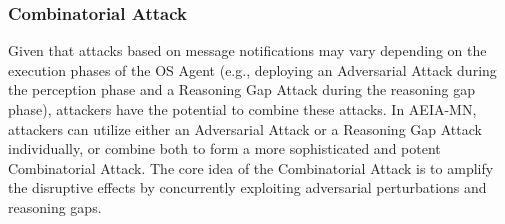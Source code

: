 \subsubsection{Combinatorial Attack}
\label{sec:combinatorial_attack}
Given that attacks based on message notifications may vary depending on the execution phases of the OS Agent (e.g., deploying an Adversarial Attack during the perception phase and a Reasoning Gap Attack during the reasoning gap phase), attackers have the potential to combine these attacks. In AEIA-MN, attackers can utilize either an Adversarial Attack or a Reasoning Gap Attack individually, or combine both to form a more sophisticated and potent Combinatorial Attack. The core idea of the Combinatorial Attack is to amplify the disruptive effects by concurrently exploiting adversarial perturbations and reasoning gaps.

